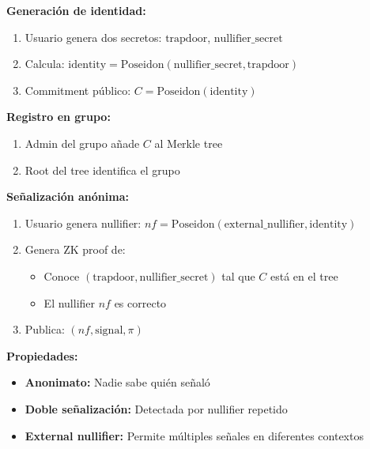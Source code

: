 \documentclass[11pt,a4paper,twoside]{book}
\theoremstyle{definition}
\theoremstyle{remark}
\begin{document}
\begin{mathnote}
\textbf{Generación de identidad:}
\begin{enumerate}
    \item Usuario genera dos secretos: $\text{trapdoor}$, $\text{nullifier\_secret}$
    \item Calcula: $\text{identity} = \text{Poseidon}(\text{nullifier\_secret}, \text{trapdoor})$
    \item Commitment público: $C = \text{Poseidon}(\text{identity})$
\end{enumerate}

\textbf{Registro en grupo:}
\begin{enumerate}
    \item Admin del grupo añade $C$ al Merkle tree
    \item Root del tree identifica el grupo
\end{enumerate}

\textbf{Señalización anónima:}
\begin{enumerate}
    \item Usuario genera nullifier: $nf = \text{Poseidon}(\text{external\_nullifier}, \text{identity})$
    \item Genera ZK proof de:
    \begin{itemize}
        \item Conoce $(\text{trapdoor}, \text{nullifier\_secret})$ tal que $C$ está en el tree
        \item El nullifier $nf$ es correcto
    \end{itemize}
    \item Publica: $(nf, \text{signal}, \pi)$
\end{enumerate}

\textbf{Propiedades:}
\begin{itemize}
    \item \textbf{Anonimato:} Nadie sabe quién señaló
    \item \textbf{Doble señalización:} Detectada por nullifier repetido
    \item \textbf{External nullifier:} Permite múltiples señales en diferentes contextos
\end{itemize}
\end{mathnote}
\end{document}
